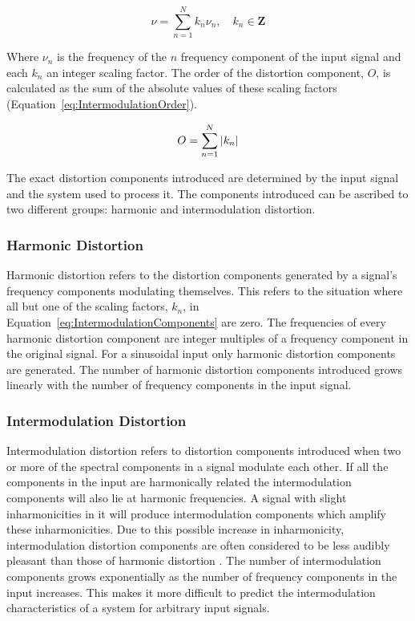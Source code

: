 		\begin{equation}
			\nu = \sum_{n = 1}^{N} k_{n}\nu_{n}, \quad k_{n} \in \textbf{Z}
			\label{eq:IntermodulationComponents}
		\end{equation}

		Where $\nu_{n}$ is the frequency of the $n$ frequency component of the input signal and each
		$k_{n}$ an integer scaling factor. The order of the distortion component, $O$, is calculated as the sum of
		the absolute values of these scaling factors (Equation~\ref{eq:IntermodulationOrder}).

		\begin{equation}
			O = \sum_{n = 1}^{N} \left|k_{n}\right|
			\label{eq:IntermodulationOrder}
		\end{equation}

		The exact distortion components introduced are determined by the input signal and the system used to
		process it. The components introduced can be ascribed to two different groups: harmonic and intermodulation
		distortion.

		\subsubsection*{Harmonic Distortion}
			Harmonic distortion refers to the distortion components generated by a signal's frequency
			components modulating themselves. This refers to the situation where all but one of the scaling
			factors, $k_{n}$, in Equation~\ref{eq:IntermodulationComponents} are zero. The frequencies of every
			harmonic distortion component are integer multiples of a frequency component in the original
			signal. For a sinusoidal input only harmonic distortion components are generated. The number of
			harmonic distortion components introduced grows linearly with the number of frequency components in
			the input signal.

		\subsubsection*{Intermodulation Distortion}
			Intermodulation distortion refers to distortion components introduced when two or more of the
			spectral components in a signal modulate each other. If all the components in the input are
			harmonically related the intermodulation components will also lie at harmonic frequencies. A signal
			with slight inharmonicities in it will produce intermodulation components which amplify these
			inharmonicities. Due to this possible increase in inharmonicity, intermodulation distortion
			components are often considered to be less audibly pleasant than those of harmonic distortion
			\citep{rumsey2009sound}. The number of intermodulation components grows exponentially as the number
			of frequency components in the input increases. This makes it more difficult to predict the
			intermodulation characteristics of a system for arbitrary input signals.

